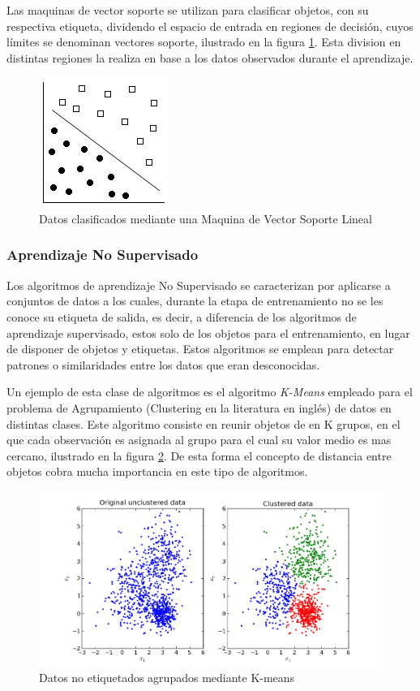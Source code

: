 \documentclass[a4paper,11pt,spanish]{book}
\begin{document}
	Las maquinas de vector soporte se utilizan para clasificar objetos, con su respectiva etiqueta, dividendo el espacio de entrada en regiones de decisión, cuyos límites
	se denominan vectores soporte, ilustrado en la figura \ref{fig:svm}. Esta division en distintas regiones la realiza en base a los datos observados durante el aprendizaje.

	\begin{figure}[H]
	  \includegraphics[scale=0.5]{./img/linear_svm.png}
	  \caption{Datos clasificados mediante una Maquina de Vector Soporte Lineal}
	  \label{fig:svm}
	\end{figure}

      \subsubsection{Aprendizaje No Supervisado}
	  Los algoritmos de aprendizaje No Supervisado se caracterizan por aplicarse a conjuntos de datos a los cuales, durante la etapa de entrenamiento no se les conoce su etiqueta
	  de salida, es decir, a diferencia de los algoritmos de aprendizaje supervisado, estos solo de los objetos para el entrenamiento, en lugar de disponer
	  de objetos y etiquetas. Estos algoritmos se emplean para detectar patrones o similaridades entre los datos que eran desconocidas.

	  Un ejemplo de esta clase de algoritmos es el algoritmo \emph{K-Means} empleado para el problema de Agrupamiento (Clustering en la literatura en inglés) de datos en distintas clases.
	  Este algoritmo consiste en reunir objetos de en K grupos, en el que cada observación es asignada al grupo para el cual su valor medio es mas cercano, ilustrado en la figura \ref{fig:clustering}.
	  De esta forma el concepto de distancia entre objetos cobra mucha importancia en este tipo de algoritmos.

	  \begin{figure}[H]
	    \includegraphics[scale=0.5]{./img/stackoverflow_clustering.png}
	    \caption{Datos no etiquetados agrupados mediante K-means}
	    \label{fig:clustering}
	  \end{figure}
\end{document}
